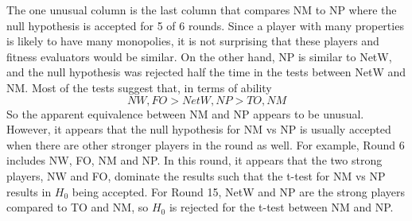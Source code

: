 The one unusual column is the last column that compares NM to NP where the null
hypothesis is accepted for 5 of 6 rounds. Since a player with many properties is
likely to have many monopolies, it is not surprising that these players and
fitness evaluators would be similar. On the other hand, NP is similar to NetW,
and the null hypothesis was rejected half the time in the tests between NetW and
NM. Most of the tests suggest that, in terms of ability
\begin{equation*}
NW,FO>NetW,NP>TO,NM
\end{equation*}
So the apparent equivalence between NM and NP appears to be unusual. However,
it appears that the null hypothesis for NM vs NP is usually accepted when there
are other stronger players in the round as well. For example, Round 6 includes 
NW, FO, NM and NP. In this round, it appears that the two strong players, NW and
FO, dominate the results such that the t-test for NM vs NP results in $H_{0}$
being accepted. For Round 15, NetW and NP are the strong players compared to TO
and NM, so $H_{0}$ is rejected for the t-test between NM and NP.

